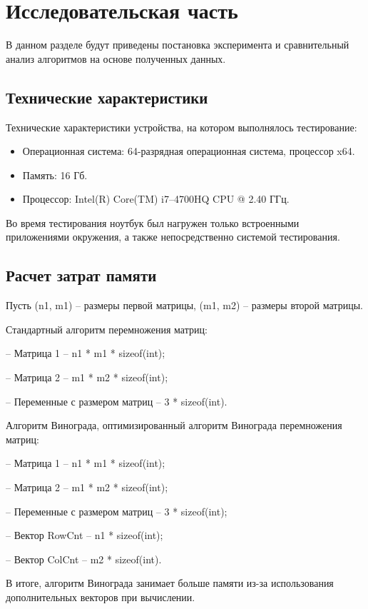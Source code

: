 \chapter{Исследовательская часть}

В данном разделе будут приведены постановка эксперимента и сравнительный анализ алгоритмов на основе полученных данных.

\section{Технические характеристики}

Технические характеристики устройства, на котором выполнялось тестирование:

\begin{itemize}
	\item Операционная система: 64-разрядная операционная система, процессор x64.
	\item Память: 16 Гб.
	\item Процессор: Intel(R) Core(TM) i7--4700HQ CPU @ 2.40 ГГц.
\end{itemize}

Во время тестирования ноутбук был нагружен только встроенными приложениями окружения, а также непосредственно системой тестирования.

\section{Расчет затрат памяти}
Пусть (n1, m1) -- размеры первой матрицы, (m1, m2) -- размеры второй матрицы.


Стандартный алгоритм перемножения матриц:
		
		
		-- Матрица 1 -- n1 * m1 * sizeof(int);
		
		
		-- Матрица 2 -- m1 * m2 * sizeof(int);
		
		
		-- Переменные с размером матриц -- 3 * sizeof(int).


Алгоритм Винограда, оптимизированный алгоритм Винограда перемножения матриц:


		-- Матрица 1 -- n1 * m1 * sizeof(int);


		-- Матрица 2 -- m1 * m2 * sizeof(int);


		-- Переменные с размером матриц -- 3 * sizeof(int);


		-- Вектор RowCnt -- n1 * sizeof(int);


		-- Вектор ColCnt -- m2 * sizeof(int).


В итоге, алгоритм Винограда занимает больше памяти из-за использования дополнительных векторов при вычислении.
